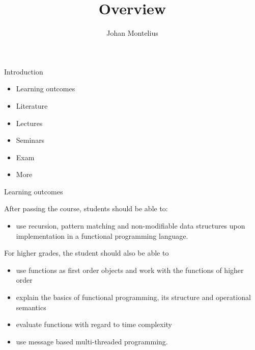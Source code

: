 

\title[ID1019 Overview]{Overview}


\author{Johan Montelius}
\date{\semester}



\begin{frame}
\titlepage
\end{frame}


\begin{frame}{Introduction}
  \begin{itemize}
    \pause \item Learning outcomes
    \pause \item Literature
    \pause \item Lectures
    \pause \item Seminars
    \pause \item Exam
    \pause \item More
  \end{itemize}
\end{frame}


\begin{frame}{Learning outcomes}

After passing the course, students should be able to:

\begin{itemize}
\item use recursion, pattern matching and  non-modifiable data structures upon implementation in a functional programming language.
\end{itemize}

\pause

For higher grades, the student should also be able to

\begin{itemize}
\item use functions as first order objects and work with the functions of higher order
\item explain the basics of functional programming, its structure and operational semantics
\item evaluate functions with regard to time complexity
\item use message based multi-threaded programming.   
\end{itemize}

\end{frame}


